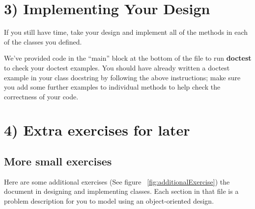 \documentclass[12pt]{article}
\begin{document}
\bigskip

\section*{3) Implementing Your Design}

If you still have time, take your design and implement all of the methods in each
of the classes you defined.

\bigskip

\noindent We’ve provided code in the “main” block at the bottom of the file to
run \textbf{doctest} to check your doctest examples. You should have already
written a doctest example in your class docstring by following the above instructions;
make sure you add some further examples to individual methods to help check the
correctness of your code.

\bigskip

\section*{4) Extra exercises for later}

\subsection*{More small exercises}
Here are some additional exercises (See figure ~\ref{fig:additionalExercise}) the
document in designing and implementing classes. Each section in that file is a
problem description for you to model using an object-oriented design.

\bigskip
\end{document}
